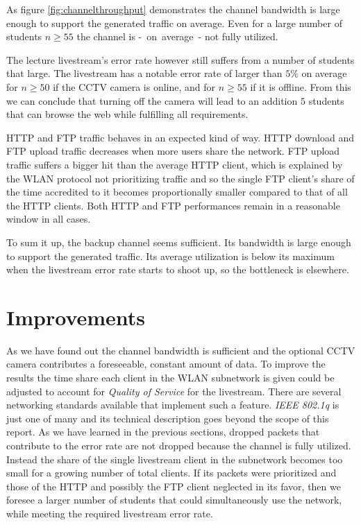 \documentclass[a4paper]{scrreprt}
\begin{document}
		 	As figure \ref{fig:channelthroughput} demonstrates the channel bandwidth is large enough to support the generated traffic on average. Even for a large number of students $n\geq 55$ the channel is -~on~average~- not fully utilized. 
		 	
		 	The lecture livestream's error rate however still suffers from a number of students that large. The livestream has a notable error rate of larger than $5\%$ on average for $n\geq 50$ if the CCTV camera is online, and for $n\geq 55$ if it is offline. From this we can conclude that turning off the camera will lead to an addition $5$ students that can browse the web while fulfilling all requirements.
		 	
		 	HTTP and FTP traffic behaves in an expected kind of way. HTTP download and FTP upload traffic decreases when more users share the network. FTP upload traffic suffers a bigger hit than the average HTTP client, which is explained by the WLAN protocol not prioritizing traffic and so the single FTP client's share of the time accredited to it becomes proportionally smaller compared to that of all the HTTP clients. Both HTTP and FTP performances remain in a reasonable window in all cases.
		 	
		 	To sum it up, the backup channel seems sufficient. Its bandwidth is large enough to support the generated traffic. Its average utilization is below its maximum when the livestream error rate starts to shoot up, so the bottleneck is elsewhere.
		 	
		 \section{Improvements}
		 	As we have found out the channel bandwidth is sufficient and the optional CCTV camera contributes a foreseeable, constant amount of data. To improve the results the time share each client in the WLAN subnetwork is given could be adjusted to account for \emph{Quality of Service} for the livestream. There are several networking standards available that implement such a feature. \emph{IEEE 802.1q} is just one of many and its technical description goes beyond the scope of this report. As we have learned in the previous sections, dropped packets that contribute to the error rate are not dropped because the channel is fully utilized. Instead the share of the single livestream client in the subnetwork becomes too small for a growing number of total clients. If its packets were prioritized and those of the HTTP and possibly the FTP client neglected in its favor, then we foresee a larger number of students that could simultaneously use the network, while meeting the required livestream error rate.
\end{document}
